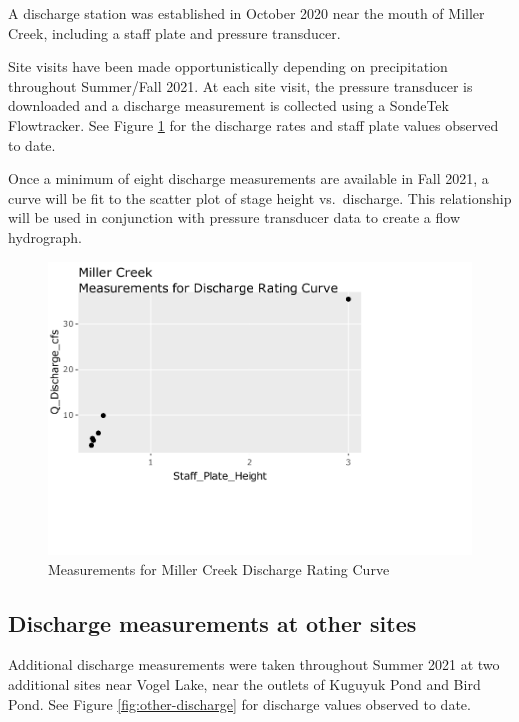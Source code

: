 \documentclass[
]{book}
\begin{document}
A discharge station was established in October 2020 near the mouth of Miller Creek, including a staff plate and pressure transducer.

Site visits have been made opportunistically depending on precipitation throughout Summer/Fall 2021. At each site visit, the pressure transducer is downloaded and a discharge measurement is collected using a SondeTek Flowtracker. See Figure \ref{fig:rating-curve} for the discharge rates and staff plate values observed to date.

Once a minimum of eight discharge measurements are available in Fall 2021, a curve will be fit to the scatter plot of stage height vs.~discharge. This relationship will be used in conjunction with pressure transducer data to create a flow hydrograph.

\begin{figure}
\centering
\includegraphics{Miller_Creek_Vogel_Lake_Water_Quality_files/figure-latex/rating-curve-1.pdf}
\caption{\label{fig:rating-curve}Measurements for Miller Creek Discharge Rating Curve}
\end{figure}

\hypertarget{discharge-measurements-at-other-sites}{%
\subsection{Discharge measurements at other sites}\label{discharge-measurements-at-other-sites}}

Additional discharge measurements were taken throughout Summer 2021 at two additional sites near Vogel Lake, near the outlets of Kuguyuk Pond and Bird Pond. See Figure \ref{fig:other-discharge} for discharge values observed to date.
\end{document}
